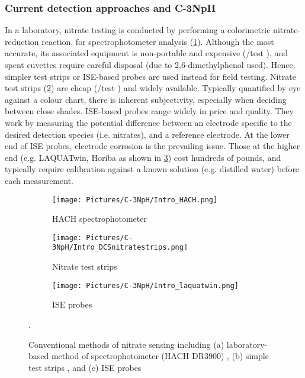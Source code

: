 \subsubsection{Current detection approaches and C-3NpH} \label{sec:current_C3nph}

In a laboratory, nitrate testing is conducted by performing a colorimetric nitrate-reduction reaction, for spectrophotometer analysis (\cref{subfig:HACH}). Although the most accurate, its associated equipment is non-portable and expensive (/test \cite{hach}), and spent cuvettes require careful disposal (due to 2,6-dimethylphenol used). Hence, simpler test strips or \gls{ISE}-based probes are used instead for field testing. Nitrate test strips (\cref{subfig:DCSstrips}) are cheap (/test \cite{DCSnit}) and widely available. Typically quantified by eye against a colour chart, there is inherent subjectivity, especially when deciding between close shades. \gls{ISE}-based probes range widely in price and quality. They work by measuring the potential difference between an electrode specific to the desired detection species (i.e. nitrates), and a reference electrode. At the lower end of ISE probes, electrode corrosion is the prevailing issue. %
Those at the higher end (e.g. LAQUATwin, Horiba as shown in \cref{subfig:laqua}) cost hundreds of pounds, and typically require calibration against a known solution (e.g. distilled water) before each measurement.\cite{laqua} 

\begin{figure}[h!]
	\centering
	\begin{subfigure}[b]{0.4\linewidth}
		\centering
		\texttt{[image: Pictures/C-3NpH/Intro\_HACH.png]}
		\caption{HACH spectrophotometer}
		\label{subfig:HACH}
	\end{subfigure}
	\begin{subfigure}[b]{0.27\linewidth}
		\centering
		\texttt{[image: Pictures/C-3NpH/Intro\_DCSnitratestrips.png]}
		\caption{Nitrate test strips}
		\label{subfig:DCSstrips}
	\end{subfigure}
	\begin{subfigure}[b]{0.27\linewidth}
	\centering
		\texttt{[image: Pictures/C-3NpH/Intro\_laquatwin.png]}
		\caption{ISE probes}
		\label{subfig:laqua}
	\end{subfigure}
	\captionsetup{justification = centering}
	\caption{Conventional methods of nitrate sensing including (a) laboratory-based method of spectrophotometer (HACH DR3900) \cite{hach}, (b) simple test strips \cite{DCSnit}, and (c) \gls{ISE} probes \cite{laqua}}.
	\label{fig:nitmethods}
\end{figure}   	


